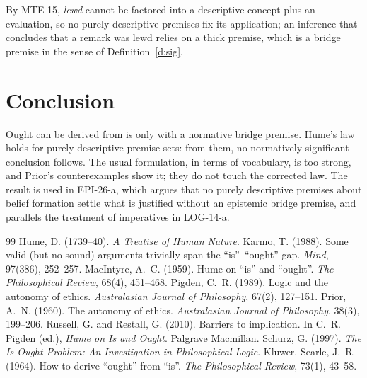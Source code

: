 \documentclass{situationist-preprint}
\begin{document}
\begin{reply}
By MTE-15, \emph{lewd} cannot be factored into a descriptive concept plus an evaluation, so no purely descriptive premises fix its application; an inference that concludes that a remark was lewd relies on a thick premise, which is a bridge premise in the sense of Definition~\ref{d:sig}.
\end{reply}

\section{Conclusion}

Ought can be derived from is only with a normative bridge premise. Hume's law holds for purely descriptive premise sets: from them, no normatively significant conclusion follows. The usual formulation, in terms of vocabulary, is too strong, and Prior's counterexamples show it; they do not touch the corrected law. The result is used in EPI-26-a, which argues that no purely descriptive premises about belief formation settle what is justified without an epistemic bridge premise, and parallels the treatment of imperatives in LOG-14-a.

\begin{thebibliography}{99}\small
{} Hume, D. (1739--40). \emph{A Treatise of Human Nature}.
 Karmo, T. (1988). Some valid (but no sound) arguments trivially span the \enquote{is}--\enquote{ought} gap. \emph{Mind}, 97(386), 252--257.
 MacIntyre, A.~C. (1959). Hume on \enquote{is} and \enquote{ought}. \emph{The Philosophical Review}, 68(4), 451--468.
 Pigden, C.~R. (1989). Logic and the autonomy of ethics. \emph{Australasian Journal of Philosophy}, 67(2), 127--151.
 Prior, A.~N. (1960). The autonomy of ethics. \emph{Australasian Journal of Philosophy}, 38(3), 199--206.
 Russell, G. and Restall, G. (2010). Barriers to implication. In C.~R. Pigden (ed.), \emph{Hume on Is and Ought}. Palgrave Macmillan.
 Schurz, G. (1997). \emph{The Is-Ought Problem: An Investigation in Philosophical Logic}. Kluwer.
 Searle, J.~R. (1964). How to derive \enquote{ought} from \enquote{is}. \emph{The Philosophical Review}, 73(1), 43--58.
\end{thebibliography}
\end{document}
